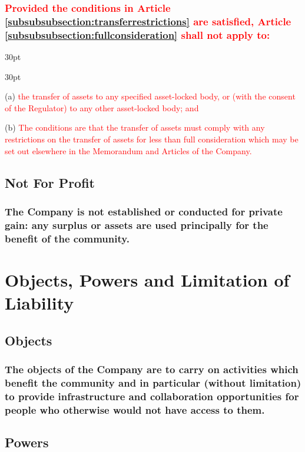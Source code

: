\documentclass[12pt]{article}
\def\clauseindent{30pt}
\newenvironment{subindentlist}{\begin{adjustwidth}{\clauseindent}{}\begin{labeledlist}{\clauseindent}}{\end{labeledlist}\end{adjustwidth}}
\begin{document}
  \subsubsection{\textcolor{red}{Provided the conditions in Article \ref{subsubsubsection:transferrestrictions} are satisfied, Article \ref{subsubsubsection:fullconsideration} shall not apply to:}}  
  \begin{subindentlist}
    \item [(a)] \textcolor{red}{the transfer of assets to any specified asset-locked body, or (with the consent of the Regulator) to any other asset-locked body; and}
    \item [(b)] \label{subsubsubsection:transferrestrictions}\textcolor{red}{The conditions are that the transfer of assets must comply with any restrictions on the transfer of assets for less than full consideration which may be set out elsewhere in the Memorandum and Articles of the Company.}
  \end{subindentlist}
\subsection{Not For Profit}
\subsubsection{The Company is not established or conducted for private gain: any surplus or assets are
used principally for the benefit of the community.}

\section*{Objects, Powers and Limitation of Liability}

\subsection{Objects}
\subsubsection{The objects of the Company are to carry on activities which benefit the community and in particular (without limitation) to provide infrastructure and collaboration opportunities for people who otherwise would not have access to them.}

\subsection{Powers}
\end{document}
